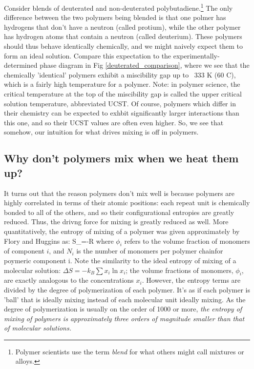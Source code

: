 \documentclass[12pt]{article}
\begin{document}
Consider blends of deuterated and non-deuterated polybutadiene.\footnote{Polymer scientists use the term \emph{blend} for what others might call mixtures or alloys.} The only difference between  the two polymers being blended is that one polmer has hydrogens that don't have a neutron (called protium), while the other polymer has hydrogen atoms that contain a neutron (called deuterium). These polymers should thus behave identically chemically, and we might naively expect them to form an ideal solution.  Compare this expectation to the experimentally-determined phase diagram in Fig \ref{deuterated_comparison}, where we see that the chemically 'identical' polymers exhibit a miscibility gap up to ~333 K (60 \degree C), which is a fairly high temperature for a polymer. Note: in polymer science, the critical temperature at the top of the miscibility gap is called the upper critical solution temperature, abbreviated UCST. Of course, polymers which differ in their chemistry can be expected to exhbit significantly larger interactions than this one, and so their UCST values are often even higher. So, we see that somehow, our intuition for what drives mixing is  off in polymers.

\subsection{Why don't polymers mix when we heat them up?}
It turns out that the reason polymers don't mix well is because polymers are highly correlated in terms of their atomic positions: each repeat unit is chemically bonded to all of the others, and so their configurational entropies are greatly reduced. Thus, the drivng force for mixing is greatly reduced as well. More quantitatively, the entropy of mixing of a polymer was given approximately by Flory and Huggins as:
\eqs
\Delta S_=-R
\eqe
where $\phi_i$ refers to the volume fraction of monomers of component $i$, and $N_i$ is the number of monomers per polymer chainfor poymeric component i. Note the similarity to the ideal entropy of mixing of a molecular solution: $\Delta S=-k_B\sum x_i \ln x_i $; the volume fractions of monomers, $\phi_i$, are exactly analogous to the concentrations $x_i$. However, the entropy terms are divided by the degree of polymerization of each polymer. It's as if each polymer is 'ball' that is ideally mixing instead of each molecular unit ideally mixing. As the degree of polymerization is usually on the order of 1000 or more, \emph{the entropy of mixing of polymers is approximately three orders of magnitude smaller than that of molecular solutions.} 
 
\end{document}
